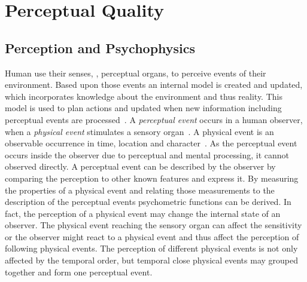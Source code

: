 \section{Perceptual Quality}\label{chap:02}
\subsection{Perception and Psychophysics}
Human use their senses, \ie, perceptual organs, to perceive events of their environment.
Based upon those events an internal model is created and updated, which incorporates knowledge about the environment and thus reality.
This model is used to plan actions and updated when new information including perceptual events are processed~\citep[p. 4]{blauert_spatial_1996}.
A \emph{perceptual event} occurs in a human observer, when a \emph{physical event} stimulates a sensory organ~\citep{blauert_spatial_1996}.
A physical event is an observable occurrence in time, location and character~\citep{callet_qualinet_2013}.
As the perceptual event occurs inside the observer due to perceptual and mental processing, it cannot observed directly.
A perceptual event can be described by the observer by comparing the perception to other known features and express it.
By measuring the properties of a physical event and relating those measurements to the description of the perceptual events psychometric functions can be derived.
In fact, the perception of a physical event may change the internal state of an observer.
The physical event reaching the sensory organ can affect the sensitivity or the observer might react to a physical event and thus affect the perception of following physical events.
The perception of different physical events is not only affected by the temporal order, but temporal close physical events may grouped together and form one perceptual event.

